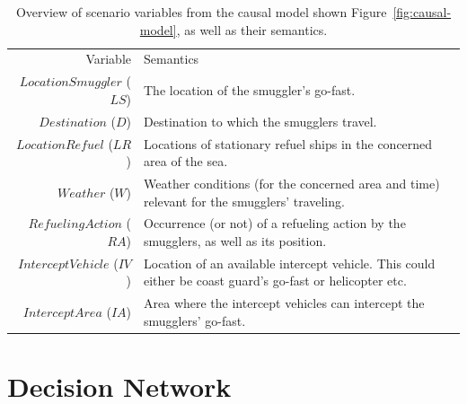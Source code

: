 \documentclass[conference]{IEEEtran}
\begin{document}
\begin{table}[!ht]
 \centering
 \caption{Overview of scenario variables from the causal model shown Figure~\ref{fig:causal-model}, as well as their semantics.}
 \begin{tabular}[!ht]{rp{5cm}}
\toprule
 Variable & Semantics \\
\cmidrule(r){1-1}
\cmidrule(l){2-2}
$LocationSmuggler$ ($LS$) &
The location of the smuggler's go-fast. \\
$Destination$ ($D$) &
Destination to which the smugglers travel. \\
$LocationRefuel$ ($LR$) &
Locations of stationary refuel ships in the concerned area of the sea. \\
$Weather$ ($W$) &
Weather conditions (for the concerned area and time) relevant for the smugglers' traveling. \\
$RefuelingAction$ ($RA$) &
Occurrence (or not) of a refueling action by the smugglers, as well as its position. \\
$InterceptVehicle$ ($IV$) &
Location of an available intercept vehicle. This could either be coast guard's go-fast or helicopter etc. \\
$InterceptArea$ ($IA$) &
Area where the intercept vehicles can intercept the smugglers' go-fast. \\
\bottomrule
\end{tabular}
\label{tab:scenario-variables}
\end{table}




\section{Decision Network}\label{sec:influence-diagrams}
\end{document}
